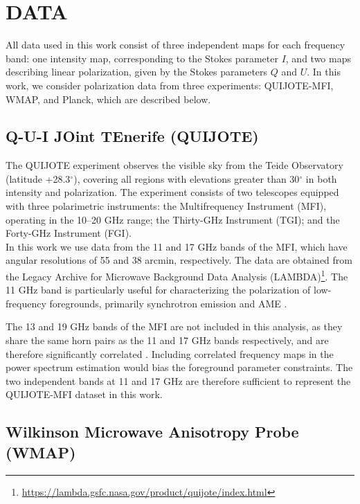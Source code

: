 \section{DATA}
\label{sec:data}

All data used in this work consist of three independent maps for each frequency band: one intensity map, corresponding to the Stokes parameter $I$, and two maps describing linear polarization, given by the Stokes parameters $Q$ and $U$. In this work, we consider polarization data from three experiments: QUIJOTE-MFI, WMAP, and Planck, which are described below.

\subsection{Q-U-I JOint TEnerife (QUIJOTE)}
\label{sec:data_quijote}

The QUIJOTE experiment \citep{QUIJOTE_IV} observes the visible sky from the Teide Observatory (latitude +28.3$^{\circ}$), covering all regions with elevations greater than 30$^{\circ}$ in both intensity and polarization. The experiment consists of two telescopes equipped with three polarimetric instruments: the Multifrequency Instrument (MFI), operating in the 10--20 GHz range; the Thirty-GHz Instrument (TGI); and the Forty-GHz Instrument (FGI).\\

In this work we use data from the 11 and 17 GHz bands of the MFI, which have angular resolutions of 55 and 38 arcmin, respectively. The data are obtained from the Legacy Archive for Microwave Background Data Analysis (LAMBDA)\footnote{\url{https://lambda.gsfc.nasa.gov/product/quijote/index.html}}. The 11 GHz band is particularly useful for characterizing the polarization of low-frequency foregrounds, primarily synchrotron emission \citep{QUIJOTE_XIX, casas_2025} and AME \citep{QUIJOTE_X, QUIJOTE_XVIII}.

The 13 and 19 GHz bands of the MFI are not included in this analysis, as they share the same horn pairs as the 11 and 17 GHz bands respectively, and are therefore significantly correlated \citep{QUIJOTE_IV}. Including correlated frequency maps in the power spectrum estimation would bias the foreground parameter constraints. The two independent bands at 11 and 17 GHz are therefore sufficient to represent the QUIJOTE-MFI dataset in this work.

\subsection{Wilkinson Microwave Anisotropy Probe (WMAP)}
\label{sec:data_wmap}

